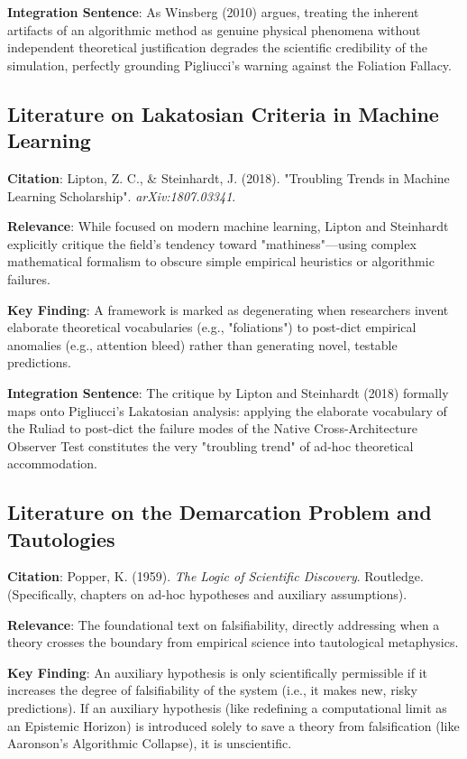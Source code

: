 \documentclass{article}
\begin{document}
\textbf{Integration Sentence}: As Winsberg (2010) argues, treating the inherent artifacts of an algorithmic method as genuine physical phenomena without independent theoretical justification degrades the scientific credibility of the simulation, perfectly grounding Pigliucci's warning against the Foliation Fallacy.

\subsection{Literature on Lakatosian Criteria in Machine Learning}
\textbf{Citation}: Lipton, Z. C., \& Steinhardt, J. (2018). "Troubling Trends in Machine Learning Scholarship". \textit{arXiv:1807.03341}.

\textbf{Relevance}: While focused on modern machine learning, Lipton and Steinhardt explicitly critique the field's tendency toward "mathiness"—using complex mathematical formalism to obscure simple empirical heuristics or algorithmic failures.

\textbf{Key Finding}: A framework is marked as degenerating when researchers invent elaborate theoretical vocabularies (e.g., "foliations") to post-dict empirical anomalies (e.g., attention bleed) rather than generating novel, testable predictions.

\textbf{Integration Sentence}: The critique by Lipton and Steinhardt (2018) formally maps onto Pigliucci's Lakatosian analysis: applying the elaborate vocabulary of the Ruliad to post-dict the failure modes of the Native Cross-Architecture Observer Test constitutes the very "troubling trend" of ad-hoc theoretical accommodation.

\subsection{Literature on the Demarcation Problem and Tautologies}
\textbf{Citation}: Popper, K. (1959). \textit{The Logic of Scientific Discovery}. Routledge. (Specifically, chapters on ad-hoc hypotheses and auxiliary assumptions).

\textbf{Relevance}: The foundational text on falsifiability, directly addressing when a theory crosses the boundary from empirical science into tautological metaphysics.

\textbf{Key Finding}: An auxiliary hypothesis is only scientifically permissible if it increases the degree of falsifiability of the system (i.e., it makes new, risky predictions). If an auxiliary hypothesis (like redefining a computational limit as an Epistemic Horizon) is introduced solely to save a theory from falsification (like Aaronson's Algorithmic Collapse), it is unscientific.
\end{document}
